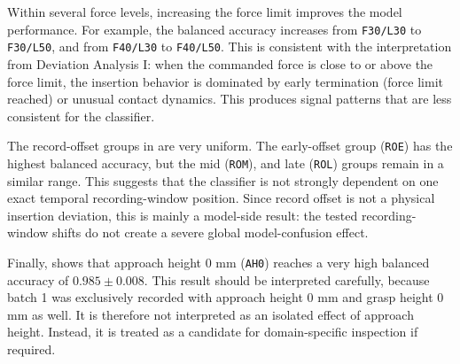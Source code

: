 Within several force levels, increasing the force limit improves the model performance. For example, the balanced accuracy increases from \texttt{F30/L30} to \texttt{F30/L50}, and from \texttt{F40/L30} to \texttt{F40/L50}. This is consistent with the interpretation from Deviation Analysis I: when the commanded force is close to or above the force limit, the insertion behavior is dominated by early termination (force limit reached) or unusual contact dynamics. This produces signal patterns that are less consistent for the classifier.

The record-offset groups in  are very uniform. The early-offset group (\texttt{ROE}) has the highest balanced accuracy, but the mid (\texttt{ROM}), and late (\texttt{ROL}) groups remain in a similar range. This suggests that the classifier is not strongly dependent on one exact temporal recording-window position. Since record offset is not a physical insertion deviation, this is mainly a model-side result: the tested recording-window shifts do not create a severe global model-confusion effect.

Finally,  shows that approach height 0 mm (\texttt{AH0}) reaches a very high balanced accuracy of $0.985 \pm 0.008$. This result should be interpreted carefully, because batch 1 was exclusively recorded with approach height 0 mm and grasp height 0 mm as well. It is therefore not interpreted as an isolated effect of approach height. Instead, it is treated as a candidate for domain-specific inspection if required.


